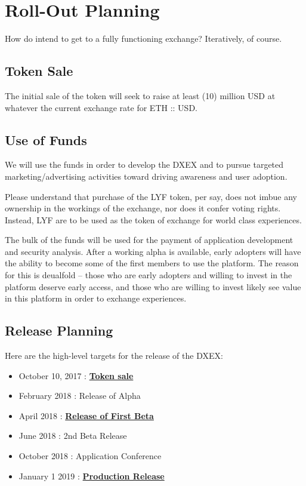 \documentclass[11pt]{article}
\begin{document}
\section{Roll-Out Planning}
\label{sec-6}
How do intend to get to a fully functioning exchange? Iteratively, of course.

\subsection{Token Sale}
\label{sec-6-1}
The initial sale of the token will seek to raise at least (10) million USD at whatever the current exchange rate for ETH :: USD.

\subsection{Use of Funds}
\label{sec-6-2}
We will use the funds in order to develop the DXEX and to pursue targeted marketing/advertising activities toward driving awareness and user adoption.

Please understand that purchase of the LYF token, per say, does not imbue any ownership in the workings of the exchange, nor does it confer voting rights. Instead, LYF are to be used as the token of exchange for world class experiences.

The bulk of the funds will be used for the payment of application development and security analysis. After a working alpha is available, early adopters will have the ability to become some of the first members to use the platform. The reason for this is deualfold -- those who are early adopters and willing to invest in the platform deserve early access, and those who are willing to invest likely see value in this platform in order to exchange experiences.

\subsection{Release Planning}
\label{sec-6-3}
Here are the high-level targets for the release of the DXEX:

\begin{itemize}
\item{October 10, 2017 : \bf \underline{Token sale}}
\item{February 2018 : Release of Alpha}
\item{April 2018 : \bf \underline{Release of First Beta}}
\item{June 2018 : 2nd Beta Release}
\item{October 2018 : Application Conference}
\item{January 1 2019 : \bf \underline{Production Release}}

\end{itemize}
\end{document}
